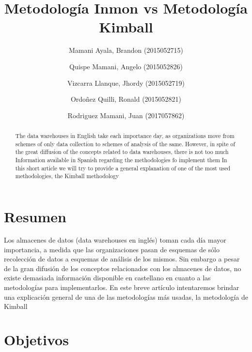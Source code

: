 \documentclass[preprint,12pt]{elsarticle}
\begin{document}
	
	\begin{frontmatter}
		
		
		\title{\huge Metodología Inmon vs Metodología Kimball}
		
		\author{Mamani Ayala, Brandon        (2015052715)}
		\author{Quispe Mamani, Angelo	      (2015052826)}
		\author{Vizcarra Llanque, Jhordy	      (2015052719)}
		\author{Ordoñez Quilli, Ronald          (2015052821)}
		\author{Rodriguez Mamani, Juan      (2017057862)}
		
		\address{Tacna, Perú}
		
		\begin{abstract}
			
The data warehouses in English take each importance day, as organizations move from schemes of only data collection to schemes of analysis of the same. However, in spite of the great diffusion of the concepts related to data warehouses, there is not too much Information available in Spanish regarding the methodologies fo implement them In this short article we will try to provide a general explanation of one of the most used methodologies, the Kimball methodology 
		\end{abstract}
\end{frontmatter}

	
	
	\section{Resumen}
Los almacenes de datos (data warehouses en inglés) toman cada día mayor importancia, a medida que las organizaciones pasan de esquemas de sólo recolección de datos a esquemas de análisis de los mismos. Sin embargo a pesar de la gran difusión de los conceptos relacionados con los almacenes de datos, no existe demasiada información disponible en castellano en cuanto a las metodologías para implementarlos. En este breve artículo intentaremos brindar una explicación general de una de las metodologías más usadas, la metodología de Kimball \\
	
	

\section{Objetivos}

	
\end{document}
